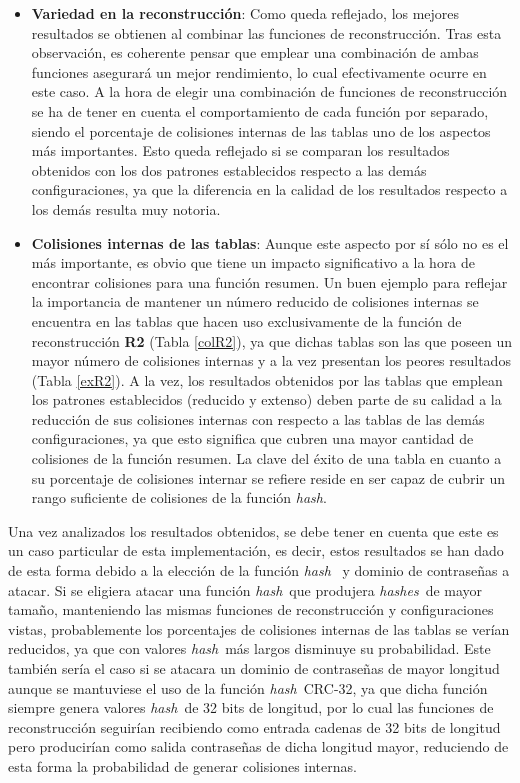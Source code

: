 \documentclass[12pt,spanish,listoffigures,listoftables,listofalgorithms]{tfgetsinf}
\newcommand{\hash}{\textit{hash}}
\newcommand{\hashes}{\textit{hashes}}
\begin{document}
\begin{itemize}

    \item \textbf{Variedad en la reconstrucción}: Como queda reflejado, los mejores resultados se obtienen al combinar las funciones de reconstrucción. Tras esta observación, es coherente pensar que emplear una combinación de ambas funciones asegurará un mejor rendimiento, lo cual efectivamente ocurre en este caso. A la hora de elegir una combinación de funciones de reconstrucción se ha de tener en cuenta el comportamiento de cada función por separado, siendo el porcentaje de colisiones internas de las tablas uno de los aspectos más importantes. Esto queda reflejado si se comparan los resultados obtenidos con los dos patrones establecidos respecto a las demás configuraciones, ya que la diferencia en la calidad de los resultados respecto a los demás resulta muy notoria.
    
	\item \textbf{Colisiones internas de las tablas}: Aunque este aspecto por sí sólo no es el más importante, es obvio que tiene un impacto significativo a la hora de encontrar colisiones para una función resumen. Un buen ejemplo para reflejar la importancia de mantener un número reducido de colisiones internas se encuentra en las tablas que hacen uso exclusivamente de la función de reconstrucción \textbf{R2} (Tabla \ref{colR2}), ya que dichas tablas son las que poseen un mayor número de colisiones internas y a la vez presentan los peores resultados (Tabla \ref{exR2}). A la vez, los resultados obtenidos por las tablas que emplean los patrones establecidos (reducido y extenso) deben parte de su calidad a la reducción de sus colisiones internas con respecto a las tablas de las demás configuraciones, ya que esto significa que cubren una mayor cantidad de colisiones de la función resumen. La clave del éxito de una tabla en cuanto a su porcentaje de colisiones internar se refiere reside en ser capaz de cubrir un rango suficiente de colisiones de la función \hash.
    
\end{itemize}

Una vez analizados los resultados obtenidos, se debe tener en cuenta que este es un caso particular de esta implementación, es decir, estos resultados se han dado de esta forma debido a la elección de la función \hash~ y dominio de contraseñas a atacar. Si se eligiera atacar una función \hash~que produjera \hashes~de mayor tamaño, manteniendo las mismas funciones de reconstrucción y configuraciones vistas, probablemente los porcentajes de colisiones internas de las tablas se verían reducidos, ya que con valores \hash~más largos disminuye su probabilidad. Este también sería el caso si se atacara un dominio de contraseñas de mayor longitud aunque se mantuviese el uso de la función \hash~CRC-32, ya que dicha función siempre genera valores \hash~de 32 bits de longitud, por lo cual las funciones de reconstrucción seguirían recibiendo como entrada cadenas de 32 bits de longitud pero producirían como salida contraseñas de dicha longitud mayor, reduciendo de esta forma la probabilidad de generar colisiones internas.
\end{document}
